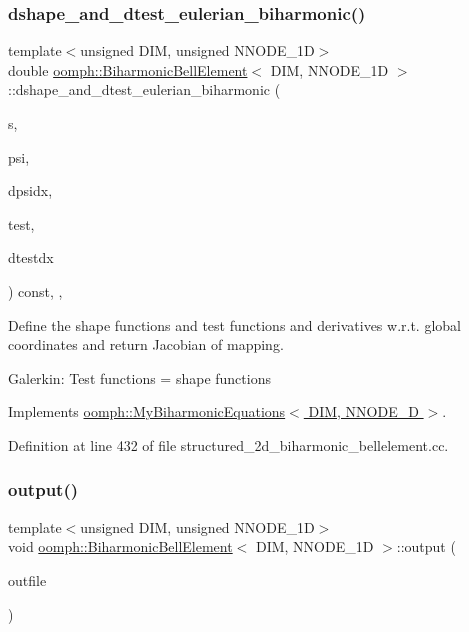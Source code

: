 \subsubsection{\texorpdfstring{dshape\+\_\+and\+\_\+dtest\+\_\+eulerian\+\_\+biharmonic()}{dshape\_and\_dtest\_eulerian\_biharmonic()}}
{\footnotesize\ttfamily template$<$unsigned D\+IM, unsigned N\+N\+O\+D\+E\+\_\+1D$>$ \\
double \hyperlink{classoomph_1_1BiharmonicBellElement}{oomph\+::\+Biharmonic\+Bell\+Element}$<$ D\+IM, N\+N\+O\+D\+E\+\_\+1D $>$\+::dshape\+\_\+and\+\_\+dtest\+\_\+eulerian\+\_\+biharmonic (\begin{DoxyParamCaption}\item[{const Vector$<$ double $>$ \&}]{s,  }\item[{Shape \&}]{psi,  }\item[{D\+Shape \&}]{dpsidx,  }\item[{Shape \&}]{test,  }\item[{D\+Shape \&}]{dtestdx }\end{DoxyParamCaption}) const\hspace{0.3cm}{\ttfamily [inline]}, {\ttfamily [protected]}, {\ttfamily [virtual]}}

Define the shape functions and test functions and derivatives w.\+r.\+t. global coordinates and return Jacobian of mapping.

Galerkin\+: Test functions = shape functions 

Implements \hyperlink{classoomph_1_1MyBiharmonicEquations_a084eaadd62185dad622c7708862f023a}{oomph\+::\+My\+Biharmonic\+Equations$<$ D\+I\+M, N\+N\+O\+D\+E\+\_\+D $>$}.



Definition at line 432 of file structured\+\_\+2d\+\_\+biharmonic\+\_\+bellelement.\+cc.

\mbox{\label{classoomph_1_1BiharmonicBellElement_ac1b81d32000ddf336783005780a90e6c}} 
\subsubsection{\texorpdfstring{output()}{output()}\hspace{0.1cm}{\footnotesize\ttfamily [1/4]}}
{\footnotesize\ttfamily template$<$unsigned D\+IM, unsigned N\+N\+O\+D\+E\+\_\+1D$>$ \\
void \hyperlink{classoomph_1_1BiharmonicBellElement}{oomph\+::\+Biharmonic\+Bell\+Element}$<$ D\+IM, N\+N\+O\+D\+E\+\_\+1D $>$\+::output (\begin{DoxyParamCaption}\item[{std\+::ostream \&}]{outfile }\end{DoxyParamCaption})\hspace{0.3cm}{\ttfamily [inline]}}



